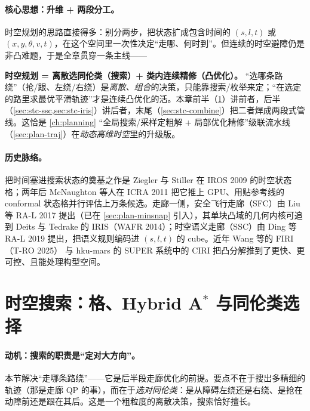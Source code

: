 \paragraph{核心思想：升维 + 两段分工。}
时空规划的思路直接得多：别分两步，把状态扩成包含时间的 $(s,l,t)$ 或 $(x,y,\theta,v,t)$，在这个空间里一次性决定“走哪、何时到”。但连续的时空避障仍是非凸难题，于是全章贯穿一条主线——
\begin{insight}
\textbf{时空规划 = 离散选同伦类（搜索）+ 类内连续精修（凸优化）。}\;
“选哪条路绕”（抢/跟、左绕/右绕）是\emph{离散、组合}的决策，只能靠搜索/枚举来定；“在选定的路里求最优平滑轨迹”才是连续凸优化的活。本章前半（\cref{sec:stc-lattice}）讲前者，后半（\cref{sec:stc-ssc,sec:stc-iris}）讲后者，末尾（\cref{sec:stc-combine}）把二者焊成两段式管线。这恰是 \cref{ch:planning} “全局搜索/采样定粗解 + 局部优化精修”级联流水线（\cref{sec:plan-traj}）在\emph{动态高维时空}里的升级版。
\end{insight}

\paragraph{历史脉络。}
把时间塞进搜索状态的奠基之作是 Ziegler 与 Stiller 在 IROS 2009 的时空状态格\cite{ziegler2009spatiotemporal}；两年后 McNaughton 等人在 ICRA 2011 把它推上 GPU、用贴参考线的 conformal 状态格并行评估上万条候选\cite{mcnaughton2011lattice}。走廊一侧，安全飞行走廊（SFC）由 Liu 等 RA-L 2017 提出\cite{liu2017corridor}（已在 \cref{sec:plan-minsnap} 引入），其单块凸域的几何内核可追到 Deits 与 Tedrake 的 IRIS（WAFR 2014）\cite{deits2015iris}；时空语义走廊（SSC）由 Ding 等 RA-L 2019 提出\cite{ding2019ssc}，把语义规则编码进 $(s,l,t)$ 的 cube。近年 Wang 等的 FIRI（T-RO 2025）\cite{wang2025firi} 与 hku-mars 的 SUPER 系统中的 CIRI\cite{ren2025super} 把凸分解推到了更快、更可控、且能处理构型空间。

\section{时空搜索：格、Hybrid \texorpdfstring{A$^*$}{A*} 与同伦类选择}
\label{sec:stc-lattice}

\paragraph{动机：搜索的职责是“定对大方向”。}
本节解决“走哪条路绕”——它是后半段走廊优化的前提。要点不在于搜出多精细的轨迹（那是走廊 QP 的事），而在于\emph{选对同伦类}：是从障碍左绕还是右绕、是抢在动障前还是跟在其后。这是一个粗粒度的离散决策，搜索恰好擅长。

